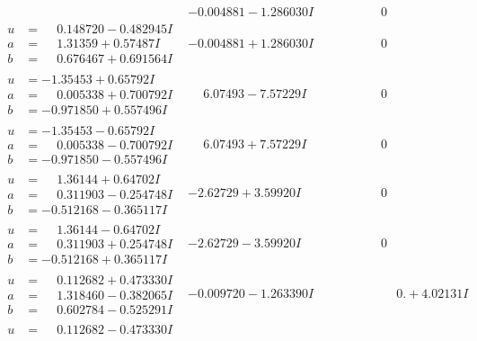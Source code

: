 \documentclass[1p]{elsarticle_modified}
\theoremstyle{definition}
\begin{document}
$$\begin{array}{c|c|c}
 & -0.004881 - 1.286030 I & \phantom{-0.000000 } 0 \\ \hline\begin{aligned}
u &= \phantom{-}0.148720 - 0.482945 I \\
a &= \phantom{-}1.31359 + 0.57487 I \\
b &= \phantom{-}0.676467 + 0.691564 I\end{aligned}
 & -0.004881 + 1.286030 I & \phantom{-0.000000 } 0 \\ \hline\begin{aligned}
u &= -1.35453 + 0.65792 I \\
a &= \phantom{-}0.005338 + 0.700792 I \\
b &= -0.971850 + 0.557496 I\end{aligned}
 & \phantom{-}6.07493 - 7.57229 I & \phantom{-0.000000 } 0 \\ \hline\begin{aligned}
u &= -1.35453 - 0.65792 I \\
a &= \phantom{-}0.005338 - 0.700792 I \\
b &= -0.971850 - 0.557496 I\end{aligned}
 & \phantom{-}6.07493 + 7.57229 I & \phantom{-0.000000 } 0 \\ \hline\begin{aligned}
u &= \phantom{-}1.36144 + 0.64702 I \\
a &= \phantom{-}0.311903 - 0.254748 I \\
b &= -0.512168 - 0.365117 I\end{aligned}
 & -2.62729 + 3.59920 I & \phantom{-0.000000 } 0 \\ \hline\begin{aligned}
u &= \phantom{-}1.36144 - 0.64702 I \\
a &= \phantom{-}0.311903 + 0.254748 I \\
b &= -0.512168 + 0.365117 I\end{aligned}
 & -2.62729 - 3.59920 I & \phantom{-0.000000 } 0 \\ \hline\begin{aligned}
u &= \phantom{-}0.112682 + 0.473330 I \\
a &= \phantom{-}1.318460 - 0.382065 I \\
b &= \phantom{-}0.602784 - 0.525291 I\end{aligned}
 & -0.009720 - 1.263390 I & \phantom{-0.000000 -}0. + 4.02131 I \\ \hline\begin{aligned}
u &= \phantom{-}0.112682 - 0.473330 I \\

\end{aligned}
\end{array}$$
\end{document}
